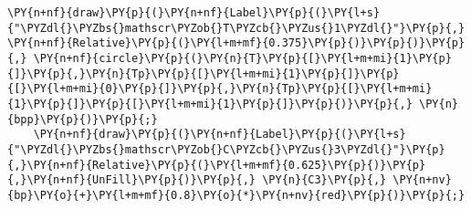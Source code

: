 \begin{Verbatim}[commandchars=\\\{\}]
    \PY{n+nf}{draw}\PY{p}{(}\PY{n+nf}{Label}\PY{p}{(}\PY{l+s}{"\PYZdl{}\PYZbs{}mathscr\PYZob{}T\PYZcb{}\PYZus{}1\PYZdl{}"}\PY{p}{,} \PY{n+nf}{Relative}\PY{p}{(}\PY{l+m+mf}{0.375}\PY{p}{)}\PY{p}{)}\PY{p}{,} \PY{n+nf}{circle}\PY{p}{(}\PY{n}{T}\PY{p}{[}\PY{l+m+mi}{1}\PY{p}{]}\PY{p}{,}\PY{n}{Tp}\PY{p}{[}\PY{l+m+mi}{1}\PY{p}{]}\PY{p}{[}\PY{l+m+mi}{0}\PY{p}{]}\PY{p}{,}\PY{n}{Tp}\PY{p}{[}\PY{l+m+mi}{1}\PY{p}{]}\PY{p}{[}\PY{l+m+mi}{1}\PY{p}{]}\PY{p}{)}\PY{p}{,} \PY{n}{bpp}\PY{p}{)}\PY{p}{;}
    \PY{n+nf}{draw}\PY{p}{(}\PY{n+nf}{Label}\PY{p}{(}\PY{l+s}{"\PYZdl{}\PYZbs{}mathscr\PYZob{}C\PYZcb{}\PYZus{}3\PYZdl{}"}\PY{p}{,}\PY{n+nf}{Relative}\PY{p}{(}\PY{l+m+mf}{0.625}\PY{p}{)}\PY{p}{,}\PY{n+nf}{UnFill}\PY{p}{)}\PY{p}{,} \PY{n}{C3}\PY{p}{,} \PY{n+nv}{bp}\PY{o}{+}\PY{l+m+mf}{0.8}\PY{o}{*}\PY{n+nv}{red}\PY{p}{)}\PY{p}{;}
\end{Verbatim}
